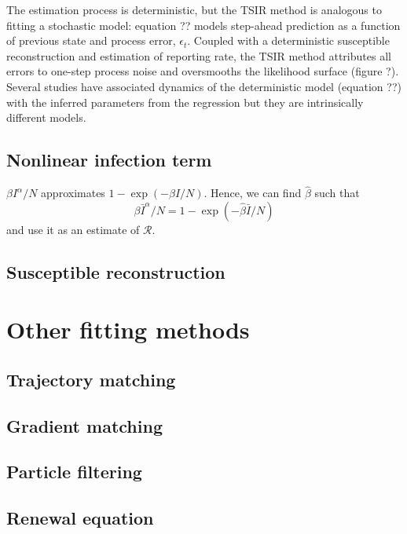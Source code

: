 \documentclass{article}
\begin{document}
The estimation process is deterministic, but the TSIR method is analogous to fitting a stochastic model: 
equation ?? models step-ahead prediction as a function of previous state and process error, $\epsilon_t$. 
Coupled with a deterministic susceptible reconstruction and estimation of reporting rate, the TSIR method attributes all errors to one-step process noise and oversmooths the likelihood surface (figure ?).
Several studies have associated dynamics of the deterministic model (equation ??) with the inferred parameters from the regression but they are intrinsically different models.

\subsection{Nonlinear infection term}


$\beta I^\alpha/N$ approximates $1 - \exp(-\beta I/N)$.
Hence, we can find $\hat\beta$ such that 
$$
\beta \bar{I}^\alpha/N = 1 - \exp(-\hat\beta \bar{I}/N)
$$
and use it as an estimate of $\mathcal R$.

\subsection{Susceptible reconstruction}


\pagebreak

\section{Other fitting methods}

\subsection{Trajectory matching}

\subsection{Gradient matching}

\subsection{Particle filtering}

\subsection{Renewal equation}

\pagebreak
\end{document}
